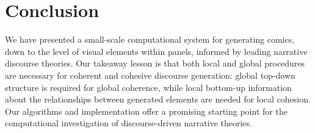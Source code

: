 \section{Conclusion}

We have presented a small-scale computational system for generating comics,
down to the level of visual elements within panels, informed by leading
narrative discourse theories.
Our takeaway lesson is that both local and global procedures are
necessary for coherent and cohesive discourse generation: global top-down
structure is required for global coherence, while local bottom-up information
about the relationships between generated elements are needed for local
cohesion. Our algorithms and implementation offer a promising starting
point for the computational investigation of discourse-driven narrative
theories.
